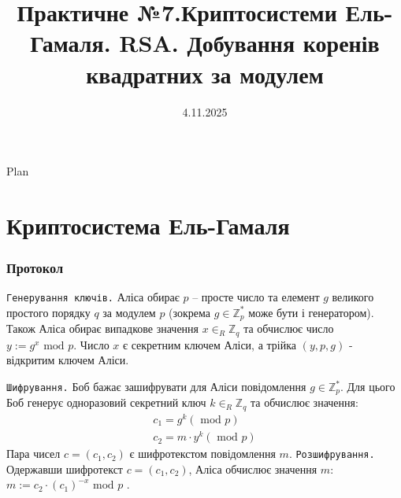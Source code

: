 \documentclass{../zkdl-presentation-template}
\title[Криптографія]{\textbf{Практичне №7.Криптосистеми Ель-Гамаля. RSA. Добування коренів квадратних за модулем}}
\date{4.11.2025}
\begin{document}
    \frame{
        \titlepage
    }
  
    \begin{frame}{Plan}
        \tableofcontents
    \end{frame}

\section{Криптосистема Ель-Гамаля} %

\begin{frame}
    \frametitle{Протокол}
    \texttt{Генерування ключів.} Аліса обирає $p$ -- просте число та елемент $g$ великого простого порядку $q$ за модулем $p$ (зокрема $g\in \mathbb{Z}^*_p$ може бути і генератором). Також Аліса обирає випадкове значення $x\in_R\mathbb{Z}_q$ та обчислює число $y:=g^x\text{ mod }p$. Число $x$ є секретним ключем Аліси, а трійка $(y,p,g)$ - відкритим ключем Аліси.
    
\texttt{Шифрування.} Боб бажає зашифрувати для Аліси повідомлення $g\in \mathbb{Z}^*_p$. Для цього Боб генерує одноразовий секретний ключ $k\in_R\mathbb{Z}_q$ та обчислює значення:
 \begin{gather*}
     c_1=g^k(\text{ mod }p)\\
     c_2=m\cdot y^k (\text{ mod }p)
 \end{gather*}
Пара чисел $c=(c_1,c_2)$ є шифротекстом повідомлення $m$.
\texttt{Розшифрування.} Одержавши шифротекст $c=(c_1,c_2)$, Аліса обчислює значення $m$: $m:=c_2\cdot (c_1)^{-x}\text{ mod }p$ .

\end{frame}
\end{document}
